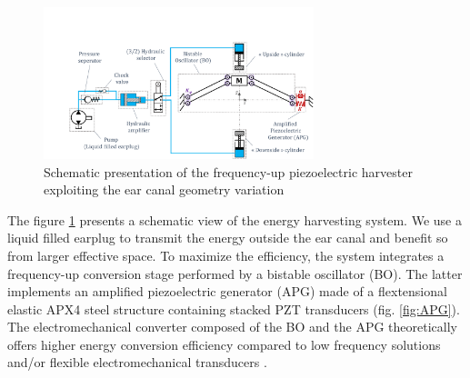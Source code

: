 \documentclass[3p,twocolumn,preprint]{elsarticle}
\begin{document}
\begin{figure}[!htbp]
	\centering
	\captionsetup{justification=centering}
	\includegraphics[trim={3.2cm 0cm 0cm 4.3cm},clip, width=0.7\textwidth]{figures/system_presentation.pdf}
	\caption{Schematic presentation of the frequency-up piezoelectric harvester exploiting the ear canal geometry variation} 
	\label{fig:system_presentation}
\end{figure}
The figure \ref{fig:system_presentation} presents a schematic view of the energy harvesting system. We use a liquid filled earplug to transmit the energy outside the ear canal and benefit so from larger effective space. To maximize the efficiency, the system integrates a frequency-up conversion stage performed by a bistable oscillator (BO). The latter implements an amplified piezoelectric generator (APG) made of a flextensional elastic APX4 steel structure containing stacked PZT transducers (fig. \ref{fig:APG}). The electromechanical converter composed of the BO and the APG theoretically offers higher energy conversion efficiency compared to low frequency solutions and/or flexible electromechanical transducers \cite{Guo2019,Peng2021,Kulah2008}.\\
\end{document}
